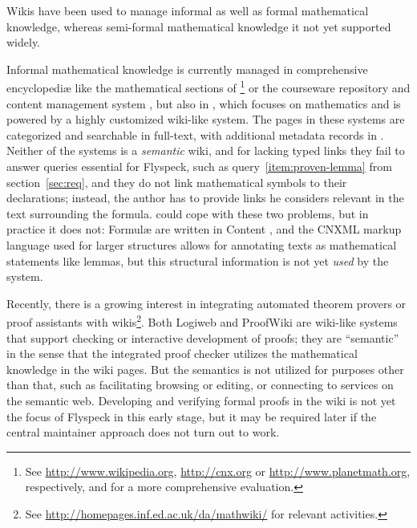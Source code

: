 Wikis have been used to manage informal as well as formal mathematical knowledge, whereas
semi-formal mathematical knowledge it not yet supported widely.

Informal mathematical knowledge is currently managed in comprehensive encyclopediæ like
the mathematical sections of \footnote{See
  \url{http://www.wikipedia.org}, \url{http://cnx.org} or \url{http://www.planetmath.org},
  respectively, and\cite{Lange:swmkm-tr07} for a more comprehensive evaluation.} or the
courseware repository and content management system
\footnotemark[\value{footnote}], but also in
\footnotemark[\value{footnote}], which focuses on mathematics and is
powered by a highly customized wiki-like system.  The pages in these systems are
categorized and searchable in full-text, with additional metadata records in
.  Neither of the systems is a \emph{semantic} wiki, and for lacking
typed links they fail to answer queries essential for Flyspeck, such as
query~\ref{item:proven-lemma} from section~\ref{sec:req}, and they do not link
mathematical symbols to their declarations; instead, the author has to provide links he
considers relevant in the text surrounding the formula.   could cope
with these two problems, but in practice it does not: Formulæ are written in Content
{\mathml}\cite{CarlisleEd:MathML07}, and the CNXML markup language used for larger
structures allows for annotating texts as mathematical statements like
lemmas\cite{connexions05:cnxml}, but this structural information is not yet \emph{used}
by the system.

Recently, there is a growing interest in integrating automated theorem provers or proof
assistants with wikis\footnote{See \url{http://homepages.inf.ed.ac.uk/da/mathwiki/} for
  relevant activities.}.  Both Logiweb and ProofWiki are wiki-like systems that support
checking or interactive development of proofs; they are ``semantic'' in the sense that the
integrated proof checker utilizes the mathematical knowledge in the wiki pages.  But the
semantics is not utilized for purposes other than that, such as facilitating browsing or
editing, or connecting to services on the semantic web.  Developing and verifying formal
proofs in the wiki is not yet the focus of Flyspeck in this early stage, but it may be
required later if the central maintainer approach does not turn out to
work.

